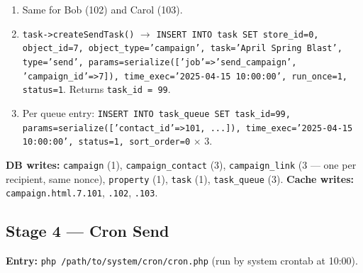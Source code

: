 \documentclass[11pt,a4paper]{article}
\begin{document}
\begin{enumerate}[leftmargin=1.6em,itemsep=2pt]
\begin{itemize}[itemsep=2pt]
                \texttt{str\_replace('\{\%campaign\_id\%\}', 7, \$link['url'])},
                then \texttt{modelCampaign->addLink(\$link, 7)}
                $\to$ \texttt{INSERT INTO campaign\_link SET
                campaign\_id=7, url='.../link?contact\_id=101\&...',
                redirect='https://shop.example/spring',
                link='<nonce>', date\_added=NOW()}.
          \item \texttt{str\_replace('\{\%contact\_id\%\}', 101, \$htmlbody)},
                \texttt{str\_replace('\{\%campaign\_id\%\}', 7, \$htmlbody)}.
          \item \texttt{cache.set("campaign.html.7.101", \$htmlbody)}.
          \item \texttt{task->addQueue(['params'=>['contact\_id'=>101,
                'name'=>'Alice', 'email'=>'alice@x.com',
                'campaign\_id'=>7], 'status'=>1,
                'time\_exec'=>'2025-04-15 10:00:00'])}.
        \end{itemize}
  \item Same for Bob (102) and Carol (103).
  \item \texttt{task->createSendTask()} $\to$
        \texttt{INSERT INTO task SET store\_id=0, object\_id=7,
        object\_type='campaign', task='April Spring Blast',
        type='send', params=serialize(['job'=>'send\_campaign',
        'campaign\_id'=>7]), time\_exec='2025-04-15 10:00:00',
        run\_once=1, status=1}. Returns \texttt{task\_id = 99}.
  \item Per queue entry: \texttt{INSERT INTO task\_queue SET
        task\_id=99, params=serialize(['contact\_id'=>101, ...]),
        time\_exec='2025-04-15 10:00:00', status=1, sort\_order=0}
        $\times$ 3.
\end{enumerate}

\textbf{DB writes:} \texttt{campaign} (1),
\texttt{campaign\_contact} (3), \texttt{campaign\_link} (3 --- one
per recipient, same nonce), \texttt{property} (1), \texttt{task}
(1), \texttt{task\_queue} (3). \textbf{Cache writes:}
\texttt{campaign.html.7.101}, \texttt{.102}, \texttt{.103}.

\subsection{Stage 4 --- Cron Send}

\textbf{Entry:} \texttt{php /path/to/system/cron/cron.php} (run
by system crontab at 10:00).
\end{document}
